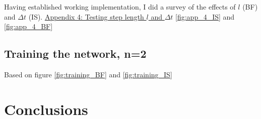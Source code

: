 \documentclass[%
oneside,                 %
final,                   %
10pt]{article}
\begin{document}
Having established working implementation, I did a survey of the effects of $l$ (BF) and $\Delta t$ (IS).  \hyperref[APP_4]{Appendix 4: Testing step length $l$ and $\Delta t$}
\ref{fig:app_4_IS} and  \ref{fig:app_4_BF} 
\subsection{Training the network, n=2}
Based on figure \ref{fig:training_BF} and  \ref{fig:training_IS} 
	


\section{Conclusions} \label{conclusions}


 \label{refer}

\end{document}

